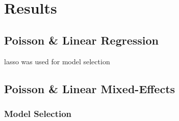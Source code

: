 \section{Results}
\subsection{Poisson \& Linear Regression}
lasso was used for model selection
\subsection{Poisson \& Linear Mixed-Effects}
\subsubsection{Model Selection}


